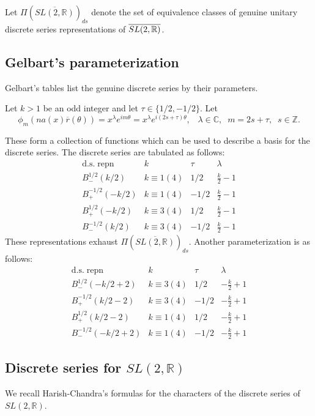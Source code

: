 \documentclass[12pt,letterpaper]{book}
\theoremstyle{plain}
\theoremstyle{definition}
\theoremstyle{remark}
\theoremstyle{remark}
\begin{document}
Let $\Pi (\overline{SL(2,\mathbb{R})})_{ds}$ denote the set of equivalence
classes of genuine unitary discrete series representations of $\overline{%
SL(2,\mathbb{R})}$.

\subsection{\texorpdfstring{Gelbart's parameterization \cite[p.~75]{Ge2}}{Gelbart's parameterization}}

Gelbart's tables list the genuine discrete series by their parameters.


Let $k>1$ be an odd integer and let $\tau \in \{1/2,-1/2\}$. Let
\[
\phi _m(na(x)\overline{r}(\theta ))=x^\lambda e^{im\theta }=x^\lambda
e^{i(2s+\tau )\theta },\;\;\;\lambda \in \mathbb{C},\;\;m=2s+\tau ,\;\;s\in
\mathbb{Z}.
\]

These form a collection of functions which can be used to describe a basis
for the discrete series. The discrete series are tabulated as follows:
\[
\begin{array}{cccc}
\mathrm{d.s.\;repn} & k & \tau & \lambda \\
B_{-}^{1/2}(k/2) & k\equiv 1(4) & 1/2 & \frac k2-1 \\
B_{+}^{-1/2}(-k/2) & k\equiv 1(4) & -1/2 & \frac k2-1 \\
B_{+}^{1/2}(-k/2) & k\equiv 3(4) & 1/2 & \frac k2-1 \\
B_{-}^{-1/2}(k/2) & k\equiv 3(4) & -1/2 & \frac k2-1
\end{array}
\]
These representations exhaust $\Pi (\overline{SL(2,\mathbb{R})})_{ds}$. Another
parameterization is as follows:
\[
\begin{array}{cccc}
\mathrm{d.s.\;repn} & k & \tau & \lambda \\
B_{-}^{1/2}(-k/2+2) & k\equiv 3(4) & 1/2 & -\frac k2+1 \\
B_{+}^{-1/2}(k/2-2) & k\equiv 3(4) & -1/2 & -\frac k2+1 \\
B_{+}^{1/2}(k/2-2) & k\equiv 1(4) & 1/2 & -\frac k2+1 \\
B_{-}^{-1/2}(-k/2+2) & k\equiv 1(4) & -1/2 & -\frac k2+1
\end{array}
\]

\subsection{Discrete series for \texorpdfstring{$SL(2,\mathbb{R})$}{SL(2,R)}}

We recall Harish-Chandra's formulas for the characters of the discrete series of $SL(2,{\mathbb R})$.
\end{document}
